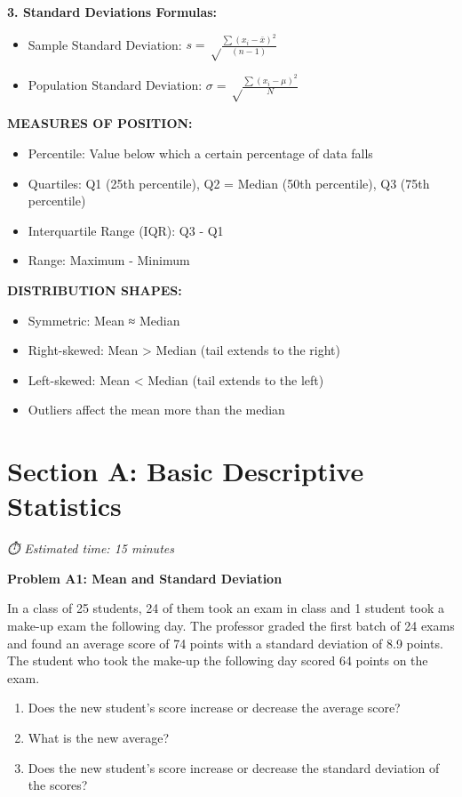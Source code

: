 \documentclass[
  11pt,
]{article}
\providecommand{\tightlist}{%
  \setlength{\itemsep}{0pt}\setlength{\parskip}{0pt}}\usepackage{longtable,booktabs,array}
\begin{document}
\textbf{3. Standard Deviations Formulas:}

\begin{itemize}
\item
  Sample Standard Deviation:
  \(s = \sqrt \frac{\sum (x_i - \bar x)^2}{(n-1)}\)
\item
  Population Standard Deviation:
  \(\sigma = \sqrt \frac{\sum (x_i - \mu)^2}{N}\)
\end{itemize}

\textbf{MEASURES OF POSITION:}

\begin{itemize}
\item
  Percentile: Value below which a certain percentage of data falls
\item
  Quartiles: Q1 (25th percentile), Q2 = Median (50th percentile), Q3
  (75th percentile)
\item
  Interquartile Range (IQR): Q3 - Q1
\item
  Range: Maximum - Minimum
\end{itemize}

\textbf{DISTRIBUTION SHAPES:}

\begin{itemize}
\item
  Symmetric: Mean ≈ Median
\item
  Right-skewed: Mean \textgreater{} Median (tail extends to the right)
\item
  Left-skewed: Mean \textless{} Median (tail extends to the left)
\item
  Outliers affect the mean more than the median
\end{itemize}

\section{Section A: Basic Descriptive
Statistics}\label{section-a-basic-descriptive-statistics}

\emph{⏱️ Estimated time: 15 minutes}

\textbf{Problem A1: Mean and Standard Deviation}

In a class of 25 students, 24 of them took an exam in class and 1
student took a make-up exam the following day. The professor graded the
first batch of 24 exams and found an average score of 74 points with a
standard deviation of 8.9 points. The student who took the make-up the
following day scored 64 points on the exam.

\begin{enumerate}
\def\labelenumi{(\alph{enumi})}
\tightlist
\item
  Does the new student's score increase or decrease the average score?
\item
  What is the new average?
\item
  Does the new student's score increase or decrease the standard
  deviation of the scores?
\end{enumerate}
\end{document}
